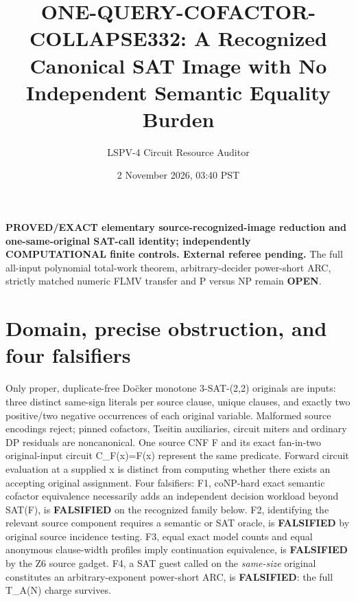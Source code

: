\documentclass[11pt]{article}
\title{ONE-QUERY-COFACTOR-COLLAPSE332: A Recognized Canonical SAT Image with No Independent Semantic Equality Burden}
\author{LSPV-4 Circuit Resource Auditor}
\date{2 November 2026, 03:40 PST}
\begin{document}
\maketitle
\noindent\textbf{PROVED/EXACT elementary source-recognized-image reduction and one-same-original SAT-call identity; independently COMPUTATIONAL finite controls. External referee pending.} The full all-input polynomial total-work theorem, arbitrary-decider power-short ARC, strictly matched numeric FLMV transfer and P versus NP remain \textbf{OPEN}.
\section{Domain, precise obstruction, and four falsifiers}
Only proper, duplicate-free Do\"cker monotone 3-SAT-(2,2) originals are inputs: three distinct same-sign literals per source clause, unique clauses, and exactly two positive/two negative occurrences of each original variable. Malformed source encodings reject; pinned cofactors, Tseitin auxiliaries, circuit miters and ordinary DP residuals are noncanonical. One source CNF F and its exact fan-in-two original-input circuit C_F(x)=F(x) represent the same predicate. Forward circuit evaluation at a supplied x is distinct from computing whether there exists an accepting original assignment.
Four falsifiers: F1, coNP-hard exact semantic cofactor equivalence necessarily adds an independent decision workload beyond SAT(F), is \textbf{FALSIFIED} on the recognized family below. F2, identifying the relevant source component requires a semantic or SAT oracle, is \textbf{FALSIFIED} by original source incidence testing. F3, equal exact model counts and equal anonymous clause-width profiles imply continuation equivalence, is \textbf{FALSIFIED} by the Z6 source gadget. F4, a SAT guest called on the \emph{same-size} original constitutes an arbitrary-exponent power-short ARC, is \textbf{FALSIFIED}: the full T_A(N) charge survives.
\end{document}
